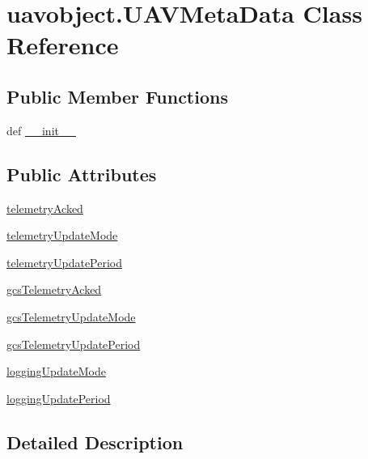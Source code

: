 \hypertarget{classuavobject_1_1_u_a_v_meta_data}{\section{uavobject.\-U\-A\-V\-Meta\-Data \-Class \-Reference}
\label{classuavobject_1_1_u_a_v_meta_data}
}
\subsection*{\-Public \-Member \-Functions}
\begin{DoxyCompactItemize}
\item 
def \hyperlink{classuavobject_1_1_u_a_v_meta_data_ac0abd22ffe596bda2ac028ddaa582387}{\-\_\-\-\_\-init\-\_\-\-\_\-}
\end{DoxyCompactItemize}
\subsection*{\-Public \-Attributes}
\begin{DoxyCompactItemize}
\item 
\hyperlink{classuavobject_1_1_u_a_v_meta_data_afb6f8a63345f7ac6e36b48400534c798}{telemetry\-Acked}
\item 
\hyperlink{classuavobject_1_1_u_a_v_meta_data_aea4f49d7c54e1f183409310cec519484}{telemetry\-Update\-Mode}
\item 
\hyperlink{classuavobject_1_1_u_a_v_meta_data_ae382d79f856678583a218692c901d843}{telemetry\-Update\-Period}
\item 
\hyperlink{classuavobject_1_1_u_a_v_meta_data_acac2f46750953cdd2c0f506a7a627971}{gcs\-Telemetry\-Acked}
\item 
\hyperlink{classuavobject_1_1_u_a_v_meta_data_a11b180f745b8a0e744123807d67da310}{gcs\-Telemetry\-Update\-Mode}
\item 
\hyperlink{classuavobject_1_1_u_a_v_meta_data_a52d403f306cc0d46c9e8e48d8071aaca}{gcs\-Telemetry\-Update\-Period}
\item 
\hyperlink{classuavobject_1_1_u_a_v_meta_data_a5a8be2e2c52ca37e0fc0d60114f69412}{logging\-Update\-Mode}
\item 
\hyperlink{classuavobject_1_1_u_a_v_meta_data_a8a58e769d0a9e034e2e8ce220c777ed4}{logging\-Update\-Period}
\end{DoxyCompactItemize}


\subsection{\-Detailed \-Description}


